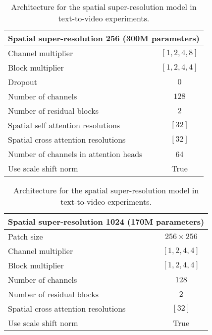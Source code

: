 \documentclass[10pt,twocolumn,letterpaper]{article}
\begin{document}
\newpage

\begin{table}[!ht]
    \centering
    \caption{Architecture for the spatial super-resolution model in text-to-video experiments.}
    \vspace{-1mm}
    \label{tab:text2video_arch_sr256}
    \begin{tabular}{l c}
        \toprule
        \multicolumn{2}{c}{Spatial super-resolution 256 (300M parameters)}\\
        \midrule
        Channel multiplier & $[1, 2, 4, 8]$ \\
        Block multiplier & $[1, 2, 4, 4]$ \\
        Dropout & $0$ \\
        Number of channels & $128$ \\
        Number of residual blocks & $2$ \\
        Spatial self attention resolutions & $[32]$ \\
        Spatial cross attention resolutions & $[32]$ \\
        Number of channels in attention heads & 64\\
        Use scale shift norm & True \\
        \bottomrule
    \end{tabular}
\end{table}

\begin{table}[!ht]
    \centering
    \caption{Architecture for the spatial super-resolution model in text-to-video experiments.}
    \vspace{-1mm}
    \label{tab:text2video_arch_sr1024}
    \begin{tabular}{l c}
        \toprule
        \multicolumn{2}{c}{Spatial super-resolution 1024 (170M parameters)}\\
        \midrule
        Patch size & $256 \times 256$ \\
        Channel multiplier & $[1, 2, 4, 4]$ \\
        Block multiplier & $[1, 2, 4, 4]$ \\
        Number of channels & $128$ \\
        Number of residual blocks & $2$ \\
        Spatial cross attention resolutions & $[32]$ \\
        Use scale shift norm & True \\
        \bottomrule
    \end{tabular}
\end{table}  \clearpage
{\small


}
\end{document}
